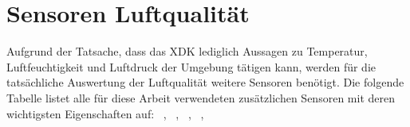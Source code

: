 \section{Sensoren Luftqualität}\label{sec:Sensoren Luftqualität}
Aufgrund der Tatsache, dass das \acs{XDK} lediglich Aussagen zu Temperatur, Luftfeuchtigkeit und Luftdruck der Umgebung tätigen kann, werden für die tatsächliche Auswertung der Luftqualität weitere Sensoren benötigt. Die folgende Tabelle listet alle für diese Arbeit verwendeten zusätzlichen Sensoren mit deren wichtigsten Eigenschaften auf: \newline
~\cite{DataSheet.MQ7}, ~\cite{DataSheet.MG811}, ~\cite{DataSheet.MQ131}, ~\cite{DataSheet.MQ135}, ~\cite{DataSheet.SDS011}
\begin{table}[H]
	\begin{center}
	\end{center}
	\caption{Übersicht Sensoren}
	\label{tab:Sensoren}
\end{table}

